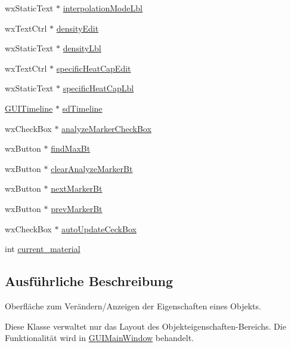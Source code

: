 \begin{DoxyCompactItemize}
\item 
wx\-Static\-Text $\ast$ \hyperlink{classPropertiesBox_a7184c404a73e32cee30ac299ef9fe649}{interpolation\-Mode\-Lbl}
\item 
wx\-Text\-Ctrl $\ast$ \hyperlink{classPropertiesBox_a0c71f6f0ea002a57ac0750e8ae9cdf13}{density\-Edit}
\item 
wx\-Static\-Text $\ast$ \hyperlink{classPropertiesBox_a1c670a16a13cb03338867a35508f7f5a}{density\-Lbl}
\item 
wx\-Text\-Ctrl $\ast$ \hyperlink{classPropertiesBox_a7058b344520a2d9ba42fe9e9c1080faa}{specific\-Heat\-Cap\-Edit}
\item 
wx\-Static\-Text $\ast$ \hyperlink{classPropertiesBox_ad49b95cb856e5f18d6717fc99ccd7b0b}{specific\-Heat\-Cap\-Lbl}
\item 
\hyperlink{classGUITimeline}{G\-U\-I\-Timeline} $\ast$ \hyperlink{classPropertiesBox_ab145e0c36e99d355f2722964da46b31a}{sd\-Timeline}
\item 
wx\-Check\-Box $\ast$ \hyperlink{classPropertiesBox_a20498b8540b84cc8f4e691aa57c7a7c3}{analyze\-Marker\-Check\-Box}
\item 
wx\-Button $\ast$ \hyperlink{classPropertiesBox_af03e4a7248c0cb91f3978eadc0936c61}{find\-Max\-Bt}
\item 
wx\-Button $\ast$ \hyperlink{classPropertiesBox_a93a88ce0e08aee33673b26ae63c7846f}{clear\-Analyze\-Marker\-Bt}
\item 
wx\-Button $\ast$ \hyperlink{classPropertiesBox_ad4a347a273ab780cf1ab941a5cf6d4b0}{next\-Marker\-Bt}
\item 
wx\-Button $\ast$ \hyperlink{classPropertiesBox_ab315d0ce0bda89ebe2c003d141df2891}{prev\-Marker\-Bt}
\item 
wx\-Check\-Box $\ast$ \hyperlink{classPropertiesBox_aea93bc13aea5197dfe5d53f6c465c0ad}{auto\-Update\-Ceck\-Box}
\item 
int \hyperlink{classPropertiesBox_a83244ddd61bfd31452a3a975b107becb}{current\-\_\-material}
\end{DoxyCompactItemize}


\subsection{Ausführliche Beschreibung}
Oberfläche zum Verändern/\-Anzeigen der Eigenschaften eines Objekts. 

Diese Klasse verwaltet nur das Layout des Objekteigenschaften-\/\-Bereichs. Die Funktionalität wird in \hyperlink{classGUIMainWindow}{G\-U\-I\-Main\-Window} behandelt. 


